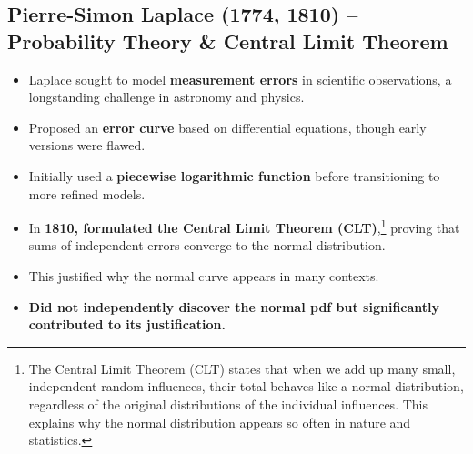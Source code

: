 \documentclass{article}
\begin{document}
\subsection{Pierre-Simon Laplace (1774, 1810) – Probability Theory \& Central Limit Theorem}
\begin{itemize}
    \item Laplace sought to model \textbf{measurement errors} in scientific observations, a longstanding challenge in astronomy and physics.
    \item Proposed an \textbf{error curve} based on differential equations, though early versions were flawed.
    \item Initially used a \textbf{piecewise logarithmic function} before transitioning to more refined models.
    \item In \textbf{1810, formulated the Central Limit Theorem (CLT)},\footnote{The Central Limit Theorem (CLT) states that when we add up many small, independent random influences, their total behaves like a normal distribution, regardless of the original distributions of the individual influences. This explains why the normal distribution appears so often in nature and statistics.} proving that sums of independent errors converge to the normal distribution.
    \item This justified why the normal curve appears in many contexts.
    \item \textbf{Did not independently discover the normal pdf but significantly contributed to its justification.}
\end{itemize}
\end{document}
